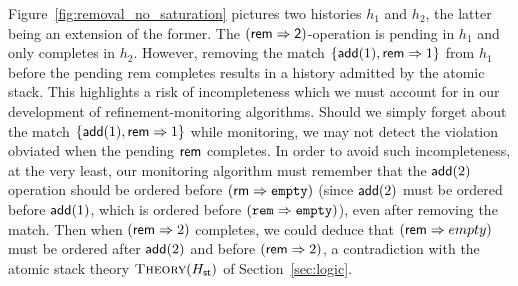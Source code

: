 \begin{example}
  \label{ex:removal_no_saturation}

  Figure~\ref{fig:removal_no_saturation} pictures two histories $h_1$ and
  $h_2$, the latter being an extension of the former. The $(\sf rem =>
  2)$-operation is pending in $h_1$ and only completes in $h_2$. However,
  removing the match ${\{ {\sf add}(1), {\sf rem} => 1 \}}$ from $h_1$ before the
  pending {\sf rem} completes results in a history admitted by the atomic
  stack. This highlights a risk of incompleteness which we must account for in
  our development of refinement-monitoring algorithms. Should we simply forget
  about the match ${\{  {\sf add}(1), {\sf rem} => 1 \}}$ while monitoring, we
  may not detect the violation obviated when the pending ${\sf rem}$ completes.
  In order to avoid such incompleteness, at the very least, our monitoring
  algorithm must remember that the ${\sf add}(2)$ operation should be ordered
  before $({\sf rm} => {\tt empty})$ (since ${\sf add}(2)$ must be ordered
  before ${\sf add}(1)$, which is ordered before $({\tt rem} => {\tt empty})$),
  even after removing the match. Then when $({\sf rem} => 2)$ completes, we
  could deduce that $({\sf rem} => empty)$ must be ordered after ${\sf add}(2)$
  and before $({\sf rem} => 2)$, a contradiction with the atomic stack theory
  $\textsc{Theory}(H_{\sf st})$ of Section~\ref{sec:logic}.

\end{example}


